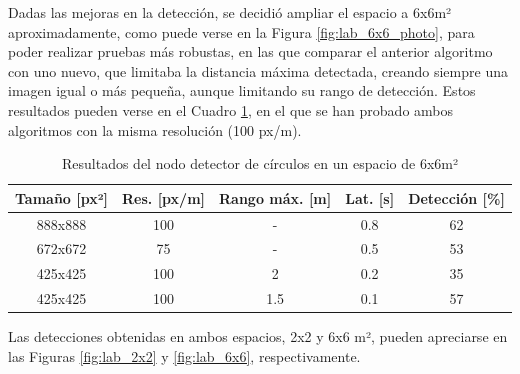 Dadas las mejoras en la detección, se decidió ampliar el espacio a 6x6m²
aproximadamente, como puede verse  en la Figura \ref{fig:lab_6x6_photo}, para
poder realizar pruebas más robustas, en las que comparar el anterior algoritmo
con uno nuevo, que limitaba la distancia máxima detectada, creando siempre una
imagen igual o más pequeña, aunque limitando su rango de detección.
Estos resultados pueden verse en el Cuadro \ref{tab:circle_results_6x6}, en el
que se han probado ambos algoritmos con la misma resolución (100 px/m).
\\

\begin{table}[h!]
\begin{center}
\begin{tabular}{|c|c|c|c|c|}
\hline
\textbf{Tamaño [px²]} & \textbf{Res. [px/m]} & \textbf{Rango máx. [m]} & \textbf{Lat. [s]} & \textbf{Detección [\%]}  \\
\hline
888x888 & 100 & -   & 0.8 & 62  \\
672x672 & 75  & -   & 0.5 & 53  \\
\hline
425x425 & 100 & 2   & 0.2 & 35  \\
425x425 & 100 & 1.5 & 0.1 & 57  \\
\hline
\end{tabular}
\caption{Resultados del nodo detector de círculos en un espacio de 6x6m²}
\label{tab:circle_results_6x6}
\end{center}
\end{table}

Las detecciones obtenidas en ambos espacios, 2x2 y 6x6 m², pueden apreciarse en
las Figuras \ref{fig:lab_2x2} y \ref{fig:lab_6x6}, respectivamente.
\\

